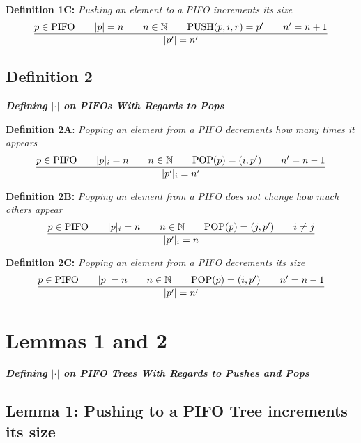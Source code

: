 \documentclass{article}
\begin{document}
\textbf{Definition 1C:} \textit{Pushing an element to a PIFO increments its size}
$$\frac{p \in \text{PIFO}  \hspace{0.7cm} |p| = n \hspace{0.7cm} n \in \mathbb{N} \hspace{0.7cm} \text{PUSH}(p, i, r) = p' \hspace{0.7cm} n' = n+1}{|p'| = n'}$$\newline

\subsection{Definition 2}
\textbf{\textit{Defining $|\cdot|$ on PIFOs With Regards to Pops}}

\hfill\break

\textbf{Definition 2A}: \textit{Popping an element from a PIFO decrements how many times it appears}
 $$\frac{p \in \text{PIFO}  \hspace{0.7cm} |p|_i = n \hspace{0.7cm} n \in \mathbb{N} \hspace{0.7cm} \text{POP}(p) = (i, p') \hspace{0.7cm} n' = n-1}{|p'|_i = n'}$$

\textbf{Definition 2B:} \textit{Popping an element from a PIFO does not change how much others appear}
$$\frac{p \in \text{PIFO}  \hspace{0.7cm} |p|_i = n \hspace{0.7cm} n \in \mathbb{N} \hspace{0.7cm} \text{POP}(p) = (j, p') \hspace{0.7cm} i \neq j}{|p'|_i = n}$$

\textbf{Definition 2C:} \textit{Popping an element from a PIFO decrements its size}
$$\frac{p \in \text{PIFO}  \hspace{0.7cm} |p| = n \hspace{0.7cm} n \in \mathbb{N} \hspace{0.7cm} \text{POP}(p) = (i, p') \hspace{0.7cm} n' = n-1}{|p'| = n'}$$\newpage

\section{Lemmas 1 and 2}
\textbf{\textit{Defining $|\cdot|$ on PIFO Trees With Regards to Pushes and Pops}}\newline

\subsection{Lemma 1: Pushing to a PIFO Tree increments its size}
\end{document}

